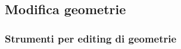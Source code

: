 \documentclass{beamer}
\begin{document}
{\begin{frame}
\end{frame}




%



\subsection{Modifica geometrie}

\begin{frame}
  \frametitle{Strumenti per editing di geometrie}


\end{frame}}
\end{document}

